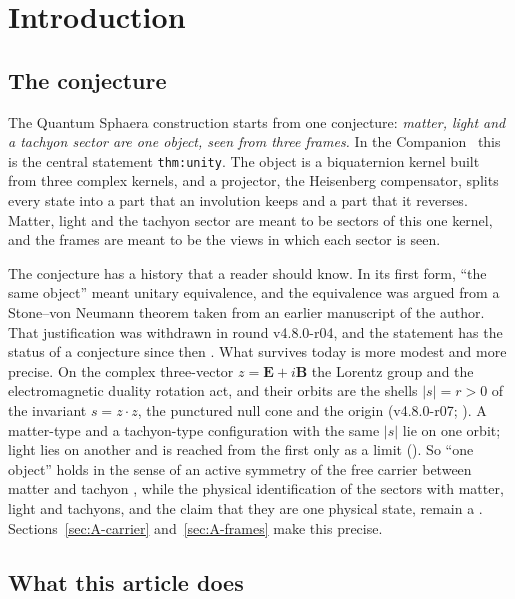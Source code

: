 \section{Introduction}
\label{sec:A-intro}

\subsection{The conjecture}
\label{sec:A-conjecture}

The Quantum Sphaera construction starts from one conjecture: \emph{matter, light and a tachyon
sector are one object, seen from three frames.} In the Companion~\cite{QSC} this is the central
statement \texttt{thm:unity}. The object is a biquaternion kernel built from three complex kernels,
and a projector, the Heisenberg compensator, splits every state into a part that an involution keeps
and a part that it reverses. Matter, light and the tachyon sector are meant to be sectors of this one
kernel, and the frames are meant to be the views in which each sector is seen.

The conjecture has a history that a reader should know. In its first form, ``the same object'' meant
unitary equivalence, and the equivalence was argued from a Stone--von Neumann theorem taken from an
earlier manuscript of the author. That justification was withdrawn in round
v4.8.0-r04, and the statement has the status of a conjecture since then \Open. What survives today
is more modest and more precise. On the complex three-vector $z=\mathbf E+i\mathbf B$ the Lorentz
group and the electromagnetic duality rotation act, and their orbits are the shells $|s|=r>0$ of the
invariant $s=z\cdot z$, the punctured null cone and the origin (v4.8.0-r07; ). A matter-type
and a tachyon-type configuration with the same $|s|$ lie on one orbit; light lies on another and is
reached from the first only as a limit (). So ``one object'' holds in the sense of an active
symmetry of the free carrier between matter and tachyon \Established, while the physical identification of the sectors
with matter, light and tachyons, and the claim that they are one physical state, remain a \Reading.
Sections~\ref{sec:A-carrier} and~\ref{sec:A-frames} make this precise.

\subsection{What this article does}
\label{sec:A-what}

